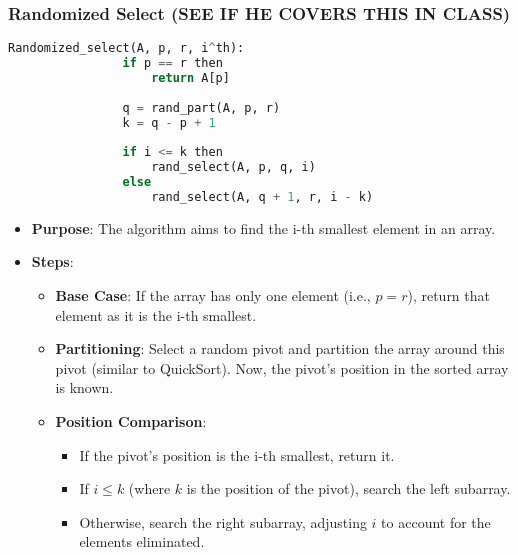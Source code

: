 
\subsubsection{Randomized Select (SEE IF HE COVERS THIS IN CLASS)}
    \begin{definition}
        \begin{lstlisting}[language=Python, caption={Randomized Select Algorithm}]
            Randomized_select(A, p, r, i^th):
                if p == r then
                    return A[p]
                
                q = rand_part(A, p, r)
                k = q - p + 1
                
                if i <= k then
                    rand_select(A, p, q, i)
                else
                    rand_select(A, q + 1, r, i - k)
            \end{lstlisting}

        \begin{itemize}
            \item \textbf{Purpose}: The algorithm aims to find the i-th smallest element in an array.
            
            \item \textbf{Steps}:
            \begin{itemize}
                \item \textbf{Base Case}: If the array has only one element (i.e., \( p = r \)), return that element as it is the i-th smallest.
                \item \textbf{Partitioning}: Select a random pivot and partition the array around this pivot (similar to QuickSort). Now, the pivot's position in the sorted array is known.
                \item \textbf{Position Comparison}:
                \begin{itemize}
                    \item If the pivot's position is the i-th smallest, return it.
                    \item If \( i \leq k \) (where \( k \) is the position of the pivot), search the left subarray.
                    \item Otherwise, search the right subarray, adjusting \( i \) to account for the elements eliminated.
                \end{itemize}
            \end{itemize}
        \end{itemize}
        \vspace{1em}


\end{definition}
